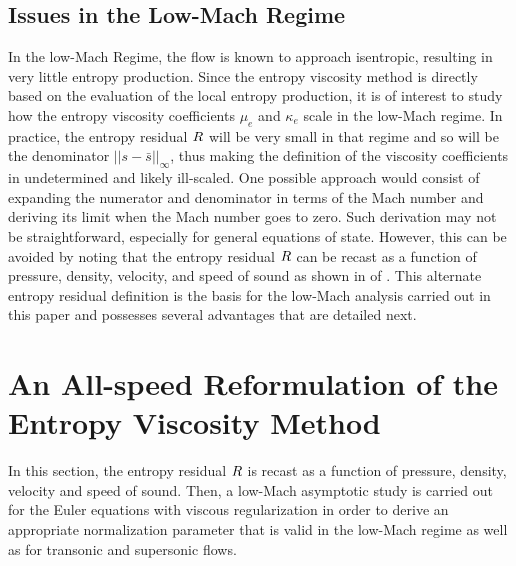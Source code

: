 \subsection{Issues in the Low-Mach Regime} 

In the low-Mach Regime, the flow is known to approach isentropic, resulting in very little entropy production. Since the entropy viscosity method is directly based on the evaluation of the local entropy production, it is of interest to study how the entropy viscosity coefficients $\mu_e$ and $\kappa_e$ scale in the low-Mach regime. In practice, the entropy residual $R$ will be very small in that regime and so will be the denominator $|| s - \bar{s} ||_\infty$, thus making the definition of the viscosity coefficients in  undetermined and likely ill-scaled.  One possible approach would consist of expanding the numerator and denominator in terms of the Mach number and deriving its limit when the Mach number goes to zero. Such derivation may not be straightforward, especially for general equations of state. However, this can be avoided by noting that the entropy residual $R$ can be recast as a function of pressure, density, velocity, and speed of sound as shown in  of . This alternate entropy residual definition is the basis for the low-Mach analysis carried out in this paper and possesses several advantages that are detailed next. %

\section{An All-speed Reformulation of the Entropy Viscosity Method} \label{sec:extension}

In this section, the entropy residual $R$ is recast as a function of pressure, density, velocity and speed of sound. Then, a low-Mach asymptotic study is carried out for the Euler equations with viscous regularization in order to derive an appropriate normalization parameter that is valid in the low-Mach regime as well as for transonic and supersonic flows. 

